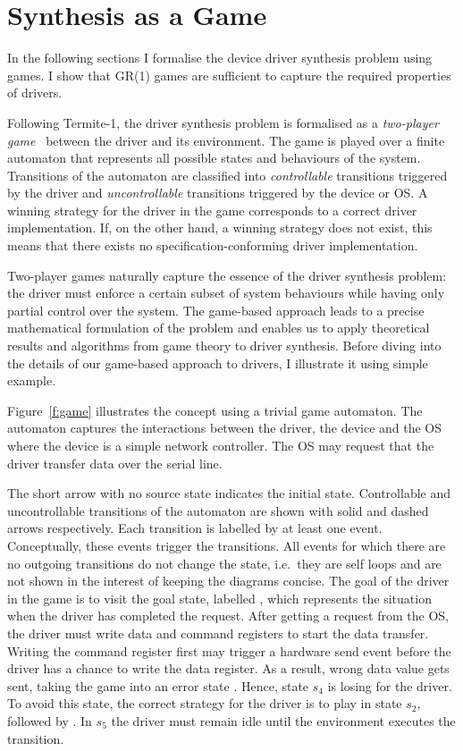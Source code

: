 \chapter{Synthesis as a Game}
\label{ch:game_formalism}

In the following sections I formalise the device driver synthesis problem using games. I show that GR(1) games are sufficient to capture the required properties of drivers.

Following Termite-1, the driver synthesis problem is formalised as a \emph{two-player game}~\cite{Thomas_95} between the driver and its environment. The game is played over a finite automaton that represents all possible states and behaviours of the system. Transitions of the automaton are classified into \emph{controllable} transitions triggered by the driver and \emph{uncontrollable} transitions triggered by the device or OS. A winning strategy for the driver in the game corresponds to a correct driver implementation. If, on the other hand, a winning strategy does not exist, this means that there exists no specification-conforming driver implementation.

Two-player games naturally capture the essence of the driver synthesis problem: the driver must enforce a certain subset of system behaviours while having only partial control over the system. The game-based approach leads to a precise mathematical formulation of the problem and enables us to apply theoretical results and algorithms from game theory to driver synthesis. Before diving into the details of our game-based approach to drivers, I illustrate it using simple example.

Figure~\ref{f:game} illustrates the concept using a trivial game automaton. The automaton captures the interactions between the driver, the device and the OS where the device is a simple network controller. The OS may request that the driver transfer data over the serial line. 

The short arrow with no source state indicates the initial state. Controllable and uncontrollable transitions of the automaton are shown with solid and dashed arrows respectively. Each transition is labelled by at least one event. Conceptually, these events trigger the transitions. All events for which there are no outgoing transitions do not change the state, i.e.\ they are self loops and are not shown in the interest of keeping the diagrams concise. The goal of the driver in the game is to visit the goal state, labelled , which represents the situation when the driver has completed the request. After getting a  request from the OS, the driver must write data and command registers to start the data transfer.  Writing the command register first may trigger a hardware send event before the driver has a chance to write the data register.  As a result, wrong data value gets sent, taking the game into an error state .  Hence, state $s_4$ is losing for the driver.  To avoid this state, the correct strategy for the driver is to play  in state $s_2$, followed by .  In $s_5$ the driver must remain idle until the environment executes the  transition.

